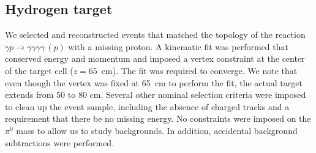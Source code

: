 \subsection{Hydrogen target}
  We selected and reconstructed events that matched the
topology of the reaction $\gamma p\rightarrow \gamma \gamma \gamma
\gamma\, (p)$ with a missing proton. A kinematic fit was performed
that conserved energy and momentum and imposed a vertex constraint at the center of the target cell
($z=65$~cm). The fit was required to converge. We note
that even though the vertex was
fixed at 65~cm to perform the fit, the actual target extends from 50
to 80 cm. Several other nominal selection criteria were imposed to clean up
the event sample, including the absence of charged tracks and a requirement
that there be no missing
energy. No constraints were imposed on the $\pi^0$ mass to allow us to study
backgrounds. In addition, accidental background subtractions were performed.
